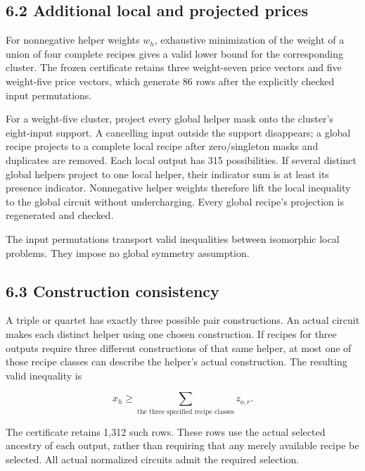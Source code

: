 \hypertarget{additional-local-and-projected-prices}{%
\subsection{6.2 Additional local and projected prices}\label{additional-local-and-projected-prices}}

For nonnegative helper weights \(w_h\), exhaustive minimization of the weight of a union of four complete recipes gives a valid lower bound for the corresponding cluster. The frozen certificate retains three weight-seven price vectors and five weight-five price vectors, which generate 86 rows after the explicitly checked input permutations.

For a weight-five cluster, project every global helper mask onto the cluster's eight-input support. A cancelling input outside the support disappears; a global recipe projects to a complete local recipe after zero/singleton masks and duplicates are removed. Each local output has 315 possibilities. If several distinct global helpers project to one local helper, their indicator sum is at least its presence indicator. Nonnegative helper weights therefore lift the local inequality to the global circuit without undercharging. Every global recipe's projection is regenerated and checked.

The input permutations transport valid inequalities between isomorphic local problems. They impose no global symmetry assumption.

\hypertarget{construction-consistency}{%
\subsection{6.3 Construction consistency}\label{construction-consistency}}

A triple or quartet has exactly three possible pair constructions. An actual circuit makes each distinct helper using one chosen construction. If recipes for three outputs require three different constructions of that same helper, at most one of those recipe classes can describe the helper's actual construction. The resulting valid inequality is

\[x_h\geq\sum_{\text{the three specified recipe classes}}z_{o,r}.\]

The certificate retains 1,312 such rows. These rows use the actual selected ancestry of each output, rather than requiring that any merely available recipe be selected. All actual normalized circuits admit the required selection.

